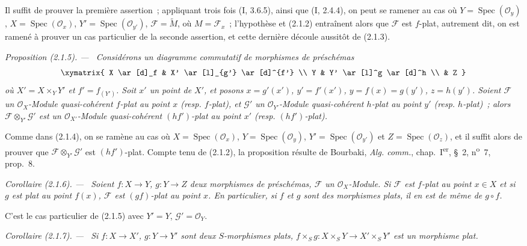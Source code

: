 \documentclass[10pt,oneside]{book}
\newcommand{\oldpage}[2][]{%
  \setcounter{footnote}{0}%
  \marginpar{\scriptsize\textbf{#1}~|~#2}\ignorespaces}
\newenvironment{proposition}[1][]{%
  \par\medskip\noindent\itshape Proposition (#1). ---\ }{\par}
\newenvironment{corollary}[1][]{%
  \par\medskip\noindent\itshape Corollaire (#1). ---\ }{\par}
\begin{document}
Il suffit de prouver la première assertion~; appliquant trois fois (I, 3.6.5),
ainsi que (I, 2.4.4), on peut se ramener au cas où
$Y=\operatorname{Spec}(\mathcal O_y)$, $X=\operatorname{Spec}(\mathcal O_x)$,
$Y'=\operatorname{Spec}(\mathcal O_{y'})$, $\mathscr F=\widetilde M$, où
$M=\mathscr F_x$~; l'hypothèse et (2.1.2) entraînent alors que $\mathscr F$
est $f$-plat, autrement dit, on est ramené à prouver un cas particulier de la
seconde assertion, et cette dernière découle aussitôt de (2.1.3).

\begin{proposition}[2.1.5]
\label{IV.2.1.5-fr}
Considérons un diagramme commutatif de morphismes de préschémas
\[
\xymatrix{
  X \ar[d]_f & X' \ar[l]_{g'} \ar[d]^{f'} \\
  Y & Y' \ar[l]^g \ar[d]^h \\
  & Z
}
\]
où $X'=X\times_Y Y'$ et $f'=f_{(Y')}$. Soit $x'$ un point de $X'$, et
posons $x=g'(x')$, $y'=f'(x')$, $y=f(x)=g(y')$, $z=h(y')$. Soient
$\mathscr F$ un $\mathcal O_X$-Module quasi-cohérent $f$-plat au point $x$
(resp. $f$-plat), et $\mathscr G'$ un $\mathcal O_{Y'}$-Module quasi-cohérent
$h$-plat au point $y'$ (resp. $h$-plat)~; alors
$\mathscr F\otimes_{Y'}\mathscr G'$ est un $\mathcal O_{X'}$-Module
quasi-cohérent $(hf')$-plat au point $x'$ (resp. $(hf')$-plat).
\end{proposition}

Comme dans (2.1.4), on se ramène au cas où
$X=\operatorname{Spec}(\mathcal O_x)$, $Y=\operatorname{Spec}(\mathcal O_y)$,
\oldpage[IV-2]{7}
$Y'=\operatorname{Spec}(\mathcal O_{y'})$ et
$Z=\operatorname{Spec}(\mathcal O_z)$, et il suffit alors de prouver que
$\mathscr F\otimes_{Y'}\mathscr G'$ est $(hf')$-plat. Compte tenu de
(2.1.2), la proposition résulte de Bourbaki, \emph{Alg. comm.},
chap.~I\textsuperscript{er}, \S~2, n\textsuperscript{o}~7, prop.~8.

\begin{corollary}[2.1.6]
\label{IV.2.1.6-fr}
Soient $f:X\to Y$, $g:Y\to Z$ deux morphismes de préschémas, $\mathscr F$ un
$\mathcal O_X$-Module. Si $\mathscr F$ est $f$-plat au point $x\in X$ et si
$g$ est plat au point $f(x)$, $\mathscr F$ est $(gf)$-plat au point $x$. En
particulier, si $f$ et $g$ sont des morphismes plats, il en est de même de
$g\circ f$.
\end{corollary}

C'est le cas particulier de (2.1.5) avec $Y'=Y$, $\mathscr G'=\mathcal O_Y$.

\begin{corollary}[2.1.7]
\label{IV.2.1.7-fr}
Si $f:X\to X'$, $g:Y\to Y'$ sont deux $S$-morphismes plats,
$f\times_S g:X\times_S Y\to X'\times_S Y'$ est un morphisme plat.
\end{corollary}
\end{document}
